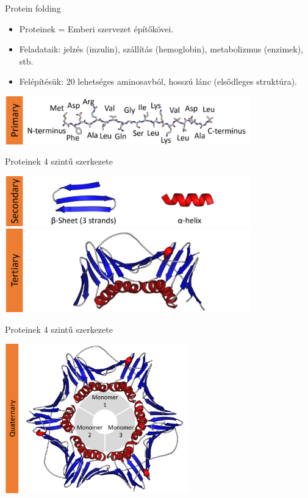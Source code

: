 \documentclass[aspectratio=169]{beamer}
\begin{document}
\begin{frame}{Protein folding}
\begin{itemize}
    \item Proteinek = Emberi szervezet építőkövei.
    \item Feladataik: jelzés (inzulin), szállítás (hemoglobin), metabolizmus (enzimek), stb.
    \item Felépítésük: 20 lehetséges aminosavból, hosszú lánc (elsődleges struktúra).
\end{itemize}
\begin{center}
\includegraphics[width=0.8\textwidth]{dipterv1_figures/protein_structure_primary.png}
\end{center}
\end{frame}

\begin{frame}{Proteinek 4 szintű szerkezete}
\begin{center}
\includegraphics[width=0.8\textwidth]{dipterv1_figures/protein_structure_secondary.png}
\includegraphics[width=0.8\textwidth]{dipterv1_figures/protein_structure_tertiary.png}
\end{center}
\end{frame}

\begin{frame}{Proteinek 4 szintű szerkezete}
\begin{center}
\includegraphics[width=0.6\textwidth]{dipterv1_figures/protein_structure_quaternary.png}
\end{center}
\end{frame}
\end{document}
